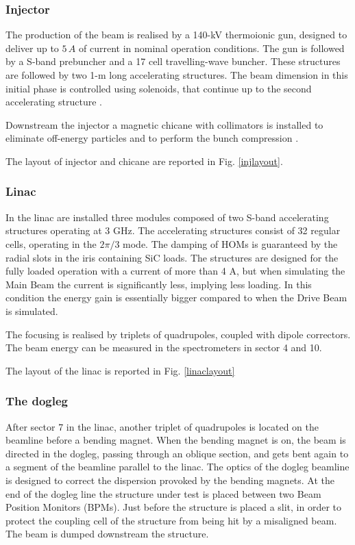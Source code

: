 \subsubsection{Injector}

The production of the beam is realised by a 140-kV thermoionic gun, designed to deliver up to $5\,A$ of current in nominal operation conditions.
The gun is followed by a S-band prebuncher and a 17 cell travelling-wave buncher. These structures are followed by two 1-m long accelerating structures. The beam dimension in this initial phase is controlled using solenoids, that continue up to the second accelerating structure \cite{ctf:injector}.

Downstream the injector a magnetic chicane with collimators is installed to eliminate off-energy particles and to perform the bunch compression  \cite{Braun:999488}.

The layout of injector and chicane are reported in Fig. \ref{injlayout}.

\subsubsection{Linac}

In the linac are installed three modules composed of two S-band accelerating structures operating at 3 GHz. The accelerating structures consist of 32 regular cells, operating in the $2\pi/3$ mode. The damping of HOMs is guaranteed by the radial slots in the iris containing SiC loads. The structures are designed for the fully loaded operation with a current of more than 4 A, but when simulating the Main Beam the current is significantly less, implying less loading. In this condition the energy gain is essentially bigger compared to when the Drive Beam is simulated.

The focusing is realised by triplets of quadrupoles, coupled with dipole correctors. The beam energy can be measured in the spectrometers in sector 4 and 10.

The layout of the linac is reported in Fig. \ref{linaclayout}

\subsubsection{The dogleg}

After sector 7 in the linac, another triplet of quadrupoles is located on the beamline before a bending magnet. When the bending magnet is on, the beam is directed in the dogleg, passing through an oblique section, and gets bent again to a segment of the beamline parallel to the linac. The optics of the dogleg beamline is designed to correct the dispersion provoked by the bending magnets. At the end of the dogleg line the structure under test is placed between two Beam Position Monitors (BPMs). Just before the structure is placed a slit, in order to protect the coupling cell of the structure from being hit by a misaligned beam. The beam is dumped downstream the structure.

